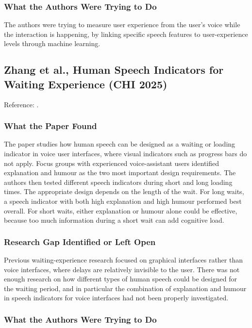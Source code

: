 \documentclass[11pt,a4paper]{report}
\begin{document}
\subsubsection{What the Authors Were Trying to Do}

The authors were trying to measure user experience from the user's
voice while the interaction is happening, by linking specific speech
features to user-experience levels through machine learning.

\subsection{Zhang et al., Human Speech Indicators for Waiting Experience
(CHI 2025)}

\noindent Reference: \autocite{speech2025waiting}.

\subsubsection{What the Paper Found}

The paper studies how human speech can be designed as a
waiting or loading indicator in voice user interfaces, where visual
indicators such as progress bars do not apply. Focus groups with
experienced voice-assistant users identified explanation and humour as
the two most important design requirements. The authors then tested
different speech indicators during short and long loading times. The
appropriate design depends on the length of the wait. For long waits, a
speech indicator with both high explanation and high humour performed
best overall. For short waits, either explanation or humour alone could
be effective, because too much information during a short wait can add
cognitive load.

\subsubsection{Research Gap Identified or Left Open}

Previous waiting-experience research focused on graphical interfaces
rather than voice interfaces, where delays are relatively invisible to
the user. There was not enough research on how different types of human
speech could be designed for the waiting period, and in particular the
combination of explanation and humour in speech indicators for voice
interfaces had not been properly investigated.

\subsubsection{What the Authors Were Trying to Do}
\end{document}
